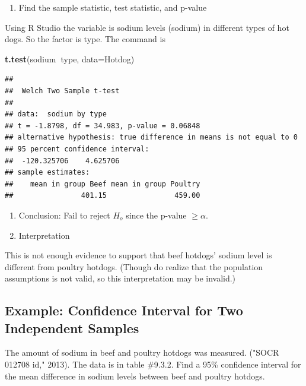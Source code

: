 \documentclass[]{book}
\newenvironment{Shaded}{\begin{snugshade}}{\end{snugshade}}
\newcommand{\DataTypeTok}[1]{\textcolor[rgb]{0.13,0.29,0.53}{#1}}
\newcommand{\KeywordTok}[1]{\textcolor[rgb]{0.13,0.29,0.53}{\textbf{#1}}}
\newcommand{\NormalTok}[1]{#1}
\newcommand{\OperatorTok}[1]{\textcolor[rgb]{0.81,0.36,0.00}{\textbf{#1}}}
\providecommand{\tightlist}{%
  \setlength{\itemsep}{0pt}\setlength{\parskip}{0pt}}
\begin{document}
\begin{enumerate}
\def\labelenumi{\arabic{enumi}.}
\setcounter{enumi}{3}
\tightlist
\item
  Find the sample statistic, test statistic, and p-value
\end{enumerate}

Using R Studio the variable is sodium levels (sodium) in different types of hot dogs. So the factor is type. The command is

\begin{Shaded}
\begin{Highlighting}[]
\KeywordTok{t.test}\NormalTok{(sodium}\OperatorTok{~}\NormalTok{type, }\DataTypeTok{data=}\NormalTok{Hotdog)}
\end{Highlighting}
\end{Shaded}

\begin{verbatim}
## 
##  Welch Two Sample t-test
## 
## data:  sodium by type
## t = -1.8798, df = 34.983, p-value = 0.06848
## alternative hypothesis: true difference in means is not equal to 0
## 95 percent confidence interval:
##  -120.325706    4.625706
## sample estimates:
##    mean in group Beef mean in group Poultry 
##                401.15                459.00
\end{verbatim}

\begin{enumerate}
\def\labelenumi{\arabic{enumi}.}
\setcounter{enumi}{4}
\item
  Conclusion: Fail to reject \(H_o\) since the p-value \(\ge \alpha\).
\item
  Interpretation
\end{enumerate}

This is not enough evidence to support that beef hotdogs' sodium level is different from poultry hotdogs. (Though do realize that the population assumptions is not valid, so this interpretation may be invalid.)

\hypertarget{example-confidence-interval-for-two-independent-samples}{%
\subsection{Example: Confidence Interval for Two Independent Samples}\label{example-confidence-interval-for-two-independent-samples}}

The amount of sodium in beef and poultry hotdogs was measured. ("SOCR 012708 id," 2013). The data is in table \#9.3.2. Find a 95\% confidence interval for the mean difference in sodium levels between beef and poultry hotdogs.
\end{document}
